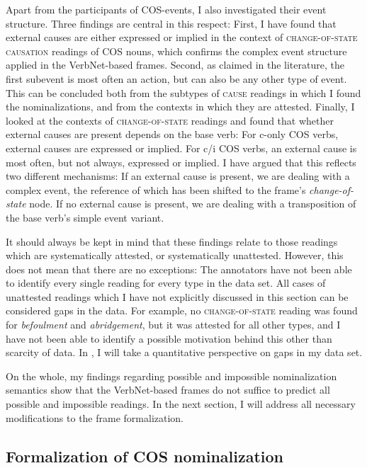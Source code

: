 Apart from the participants of COS-events, I also investigated their event structure. Three findings are central in this respect:
First, I have found that external causes are either expressed or implied in the context of \textsc{change-of-state causation} readings of COS nouns, which confirms the complex event structure applied in the VerbNet-based frames.
Second, as claimed in the literature, the first subevent is most often an action, but can also be any other type of event. This can be concluded both from the subtypes of \textsc{cause} readings in which I found the nominalizations, and from the contexts in which they are attested.
Finally, I looked at the contexts of \textsc{change-of-state} readings and found that whether external causes are present depends on the base verb: For c-only COS verbs, external causes are expressed or implied. For c/i COS verbs, an external cause is most often, but not always, expressed or implied. I have argued that this reflects two different mechanisms: If an external cause is present, we are dealing with a complex event, the reference of which has been shifted to the frame's \textit{change-of-state} node. If no external cause is present, we are dealing with a transposition of the base verb's simple event variant.  

It should always be kept in mind that these findings relate to those readings which are systematically attested, or systematically unattested. However, this does not mean that there are no exceptions: The annotators have not been able to identify every single reading for every type in the data set. All cases of unattested readings which I have not explicitly discussed in this section can be considered gaps in the data. For example, no \textsc{change-of-state} reading was found for \textit{befoulment} and \textit{abridgement}, but it was attested for all other types, and I have not been able to identify a possible motivation behind this other than scarcity of data. 
In , I will take a quantitative perspective on gaps in my data set.

On the whole, my findings regarding possible and impossible nominalization semantics show that the VerbNet-based frames do not suffice to predict all possible and impossible readings. In the next section, I will address all necessary modifications to the frame formalization. 

\subsection{Formalization of COS nominalization}
\label{sec:cos-output-formal}

